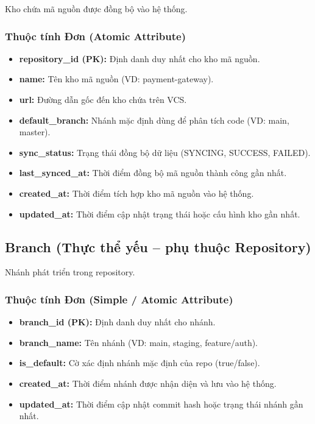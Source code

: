 Kho chứa mã nguồn được đồng bộ vào hệ thống.

\subsubsection{Thuộc tính Đơn (Atomic Attribute)}

\begin{itemize}
    \item \textbf{repository\_id (PK):} Định danh duy nhất cho kho mã nguồn.
    \item \textbf{name:} Tên kho mã nguồn (VD: payment-gateway).
    \item \textbf{url:} Đường dẫn gốc đến kho chứa trên VCS.
    \item \textbf{default\_branch:} Nhánh mặc định dùng để phân tích code (VD: main, master).
    \item \textbf{sync\_status:} Trạng thái đồng bộ dữ liệu (SYNCING, SUCCESS, FAILED).
    \item \textbf{last\_synced\_at:} Thời điểm đồng bộ mã nguồn thành công gần nhất.
    \item \textbf{created\_at:} Thời điểm tích hợp kho mã nguồn vào hệ thống.
    \item \textbf{updated\_at:} Thời điểm cập nhật trạng thái hoặc cấu hình kho gần nhất.
\end{itemize}


\subsection{Branch (Thực thể yếu -- phụ thuộc Repository)}

Nhánh phát triển trong repository.

\subsubsection{Thuộc tính Đơn (Simple / Atomic Attribute)}

\begin{itemize}
    \item \textbf{branch\_id (PK):} Định danh duy nhất cho nhánh.
    \item \textbf{branch\_name:} Tên nhánh (VD: main, staging, feature/auth).
    \item \textbf{is\_default:} Cờ xác định nhánh mặc định của repo (true/false).
    \item \textbf{created\_at:} Thời điểm nhánh được nhận diện và lưu vào hệ thống.
    \item \textbf{updated\_at:} Thời điểm cập nhật commit hash hoặc trạng thái nhánh gần nhất.
\end{itemize}


